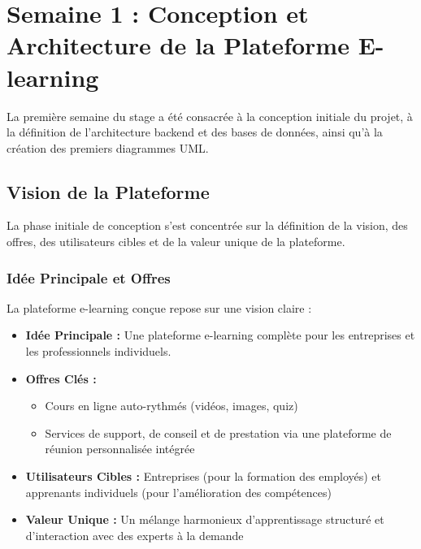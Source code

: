 \chapter{Semaine 1 : Conception et Architecture de la Plateforme E-learning}
\thispagestyle{fancy}

La première semaine du stage a été consacrée à la conception initiale du projet, à la définition de l'architecture backend et des bases de données, ainsi qu'à la création des premiers diagrammes UML.

\section{Vision de la Plateforme}
La phase initiale de conception s'est concentrée sur la définition de la vision, des offres, des utilisateurs cibles et de la valeur unique de la plateforme.

\subsection{Idée Principale et Offres}
La plateforme e-learning conçue repose sur une vision claire :
\begin{itemize}
  \item \textbf{Idée Principale :} Une plateforme e-learning complète pour les entreprises et les professionnels individuels.
  \item \textbf{Offres Clés :}
    \begin{itemize}
      \item Cours en ligne auto-rythmés (vidéos, images, quiz)
      \item Services de support, de conseil et de prestation via une plateforme de réunion personnalisée intégrée
    \end{itemize}
  \item \textbf{Utilisateurs Cibles :} Entreprises (pour la formation des employés) et apprenants individuels (pour l'amélioration des compétences)
  \item \textbf{Valeur Unique :} Un mélange harmonieux d'apprentissage structuré et d'interaction avec des experts à la demande
\end{itemize}

